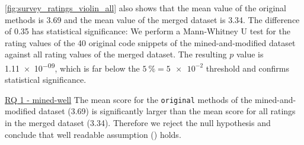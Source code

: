 \documentclass[%
class=scrreprt,
chapterprefix=false,%
open=right,%
twoside=false,%
paper=a4,%
logofile={Logo\_zentral\_farbig\_EN.png},%
thesistype=master,%
UKenglish,%
]{se2thesis}
\theoremstyle{definition}
\begin{document}
	\autoref{fig:survey_ratings_violin_all} also shows that the mean value of the original methods is 3.69 and the mean value of the merged dataset is 3.34. The difference of 0.35 has statistical significance:
	We perform a Mann-Whitney U test for the rating values of the 40 original code snippets of the mined-and-modified dataset against all rating values of the merged dataset. The resulting $p$ value is \num{1.11e-09}, which is far below the $5~\%=\num{5e-2}$ threshold and confirms statistical significance.
	

	\begin{summary}{\hyperref[mined-well]{RQ 1 - mined-well}}
		The mean score for the \texttt{original} methods of the mined-and-modified dataset (3.69) is significantly larger than the mean score for all ratings in the merged dataset (3.34). Therefore we reject the null hypothesis and conclude that well readable assumption () holds.
	\end{summary}
	
\end{document}
